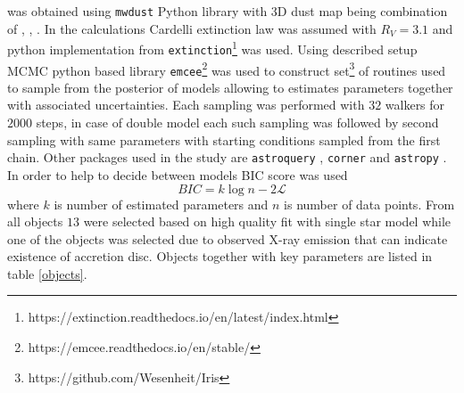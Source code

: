 \documentclass{pracalicmgr}
\begin{document}
was obtained using \texttt{mwdust} \citep{bovy_galactic_2016} Python library with 3D dust map being combination of \citep{green_3d_2019}, \citep{greiner_unusually_2001},
\citep{drimmel_three-dimensional_2003}. In the calculations Cardelli extinction law was assumed \citep{cardelli_relationship_1989}
with $R_V=3.1$ 
and python implementation from \texttt{extinction}\footnote{https://extinction.readthedocs.io/en/latest/index.html} was used.
Using described setup MCMC python based library \texttt{emcee}\footnote{https://emcee.readthedocs.io/en/stable/} \citep{foreman-mackey_emcee_2013}
was used to construct set\footnote{https://github.com/Wesenheit/Iris} of routines used to sample from the posterior of models allowing to estimates parameters together
with associated uncertainties. Each sampling was performed with $32$ walkers for $2000$ steps, in case of double model each such sampling 
was followed by second sampling with same parameters with starting conditions sampled from the first chain. 
Other packages used in the study are \texttt{astroquery} \citep{ginsburg_astroquery_2019},
 \texttt{corner} \citep{foreman-mackey_cornerpy_2016} and \texttt{astropy} \citep{astropy_collaboration_astropy_2022}.
In order to help to decide between models
BIC score was used 
\begin{equation}
    BIC=k\log{n}-2\mathcal{L}
\end{equation} where $k$ is number of estimated parameters and $n$ is  number of data points. From all objects $13$  were selected based on high quality fit with single star model while one of the objects was selected due to observed X-ray emission 
that can indicate existence of accretion disc. Objects together with key parameters are listed in table \ref{objects}.
\end{document}
